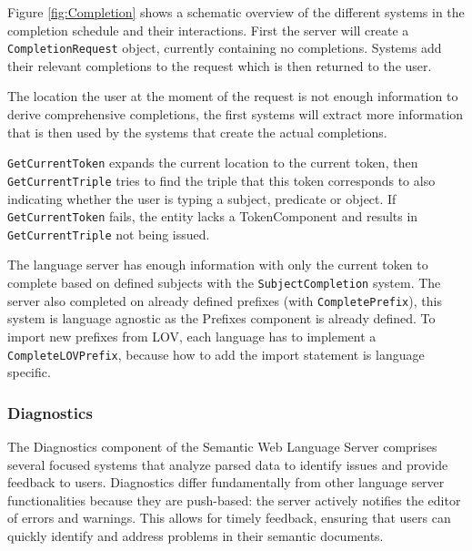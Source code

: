 Figure \ref{fig:Completion} shows a schematic overview of the different systems in the completion schedule and their interactions.
First the server will create a \texttt{CompletionRequest} object, currently containing no completions.
Systems add their relevant completions to the request which is then returned to the user.

The location the user at the moment of the request is not enough information to derive comprehensive completions, 
the first systems will extract more information that is then used by the systems that create the actual completions.

\texttt{GetCurrentToken} expands the current location to the current token, then \texttt{GetCurrentTriple} tries to find the triple that this token corresponds to also indicating whether the user is typing a subject, predicate or object.
If \texttt{GetCurrentToken} fails, the entity lacks a TokenComponent and results in \texttt{GetCurrentTriple} not being issued.

The language server has enough information with only the current token to complete based on defined subjects with the \texttt{SubjectCompletion} system.
The server also completed on already defined prefixes (with \texttt{CompletePrefix}), this system is language agnostic as the Prefixes component is already defined.
To import new prefixes from LOV, each language has to implement a \texttt{CompleteLOVPrefix}, because how to add the import statement is language specific.


\subsubsection{Diagnostics}

The Diagnostics component of the Semantic Web Language Server comprises several focused systems that analyze parsed data to identify issues and provide feedback to users.
Diagnostics differ fundamentally from other language server functionalities because they are push-based: the server actively notifies the editor of errors and warnings.
This allows for timely feedback, ensuring that users can quickly identify and address problems in their semantic documents.

